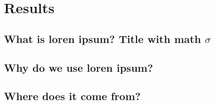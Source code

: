 
\chapter{Results}  %

\ifpdf
    \graphicspath{{Chapter4/Figs/Raster/}{Chapter4/Figs/PDF/}{Chapter4/Figs/}}
\else
    \graphicspath{{Chapter4/Figs/Vector/}{Chapter4/Figs/}}
\fi


\section{What is loren ipsum? Title with math \texorpdfstring{$\sigma$}{[sigma]}} %



\section{Why do we use loren ipsum?} %


\section{Where does it come from?}  %
\label{section4.3}

